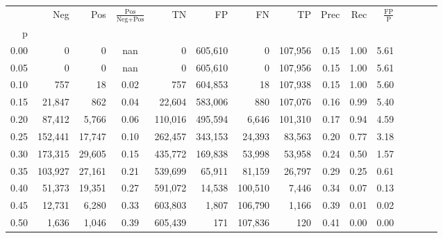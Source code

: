 \begin{tabular}{rrrcrrrrrrrrrrr}
\toprule
{} &      Neg &     Pos & $\frac{\text{Pos}}{\text{Neg}+\text{Pos}}$ &       TN &       FP &       FN &       TP &  Prec &   Rec & $\frac{\text{FP}}{\text{P}}$ \\
p    &          &         &                                            &          &          &          &          &       &       &                              \\
\midrule
0.00 &        0 &       0 &                                        nan &        0 &  605,610 &        0 &  107,956 &  0.15 &  1.00 &                         5.61 \\
0.05 &        0 &       0 &                                        nan &        0 &  605,610 &        0 &  107,956 &  0.15 &  1.00 &                         5.61 \\
0.10 &      757 &      18 &                                       0.02 &      757 &  604,853 &       18 &  107,938 &  0.15 &  1.00 &                         5.60 \\
0.15 &   21,847 &     862 &                                       0.04 &   22,604 &  583,006 &      880 &  107,076 &  0.16 &  0.99 &                         5.40 \\
0.20 &   87,412 &   5,766 &                                       0.06 &  110,016 &  495,594 &    6,646 &  101,310 &  0.17 &  0.94 &                         4.59 \\
0.25 &  152,441 &  17,747 &                                       0.10 &  262,457 &  343,153 &   24,393 &   83,563 &  0.20 &  0.77 &                         3.18 \\
0.30 &  173,315 &  29,605 &                                       0.15 &  435,772 &  169,838 &   53,998 &   53,958 &  0.24 &  0.50 &                         1.57 \\
0.35 &  103,927 &  27,161 &                                       0.21 &  539,699 &   65,911 &   81,159 &   26,797 &  0.29 &  0.25 &                         0.61 \\
0.40 &   51,373 &  19,351 &                                       0.27 &  591,072 &   14,538 &  100,510 &    7,446 &  0.34 &  0.07 &                         0.13 \\
0.45 &   12,731 &   6,280 &                                       0.33 &  603,803 &    1,807 &  106,790 &    1,166 &  0.39 &  0.01 &                         0.02 \\
0.50 &    1,636 &   1,046 &                                       0.39 &  605,439 &      171 &  107,836 &      120 &  0.41 &  0.00 &                         0.00 \\

\end{tabular}
